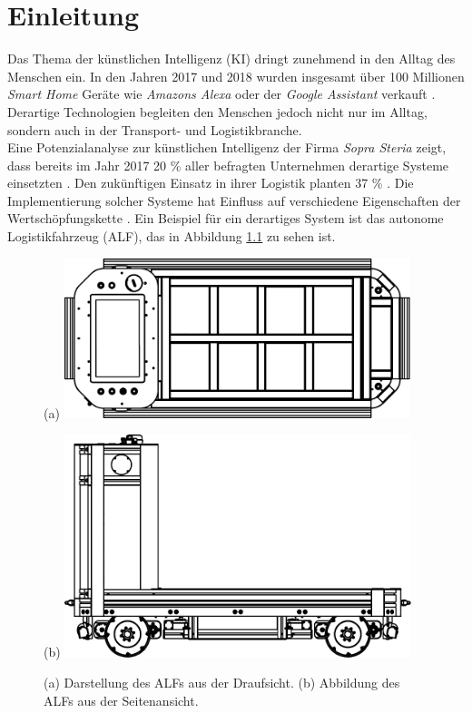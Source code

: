 
\chapter{Einleitung}
\label{ch: Einleitung}
	

		Das Thema der künstlichen Intelligenz (KI) dringt zunehmend in den Alltag des Menschen ein. In den Jahren 2017 und 2018 wurden insgesamt über 100 Millionen \textit{Smart Home} Geräte wie \textit{Amazons Alexa} oder der \textit{Google Assistant} verkauft \cite{smart}. Derartige Technologien begleiten den Menschen jedoch nicht nur im Alltag, sondern auch in der Transport- und Logistikbranche.\\
		
		Eine Potenzialanalyse zur künstlichen Intelligenz der Firma \textit{Sopra Steria} zeigt, dass bereits im Jahr 2017 20 \% aller befragten Unternehmen derartige Systeme einsetzten \cite{sopra}. Den zukünftigen Einsatz in ihrer Logistik planten 37 \% \cite{sopra}. Die Implementierung solcher Systeme hat Einfluss auf verschiedene Eigenschaften der Wertschöpfungskette \cite{sopra}. Ein Beispiel für ein derartiges System ist das autonome Logistikfahrzeug (ALF), das in Abbildung \ref{fig: Darstellung des ALFs} zu sehen ist.
		
		\begin{figure}[H]
			\begin{minipage}[b]{0.49\textwidth}
				(a)
				\includegraphics[width=0.9\textwidth]{Bilder/oben.pdf}
			\end{minipage}
			\begin{minipage}[b]{0.49\textwidth}
				(b)
				\includegraphics[width=0.9\textwidth]{Bilder/seite.pdf}
			\end{minipage}
			\centering
			\caption{(a) Darstellung des ALFs aus der Draufsicht. (b) Abbildung des ALFs aus der Seitenansicht.}
			\label{fig: Darstellung des ALFs}
		\end{figure}
		

